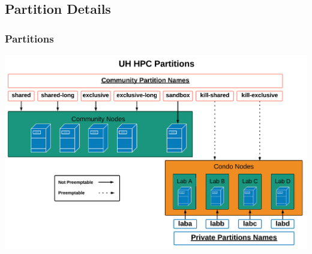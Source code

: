 %




\subsection{Partition Details}
\begin{frame}
\footnotesize
\frametitle{Partitions}
\begin{center}
  \includegraphics[scale=0.35]{partitions.png}
\end{center}
\end{frame}



